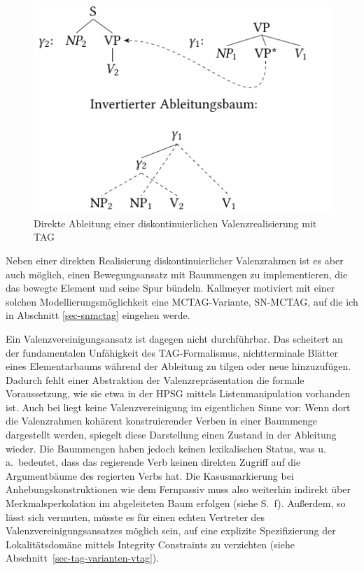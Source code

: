 \begin{figure}
\centering
\includegraphics[angle=90]{graphics/abb65.pdf}
\caption{\label{fig-kohaerenz-strategien-3}Direkte Ableitung einer diskontinuierlichen Valenzrealisierung mit TAG}
\end{figure}

Neben einer direkten Realisierung diskontinuierlicher Valenzrahmen ist es aber auch möglich, einen Bewegungsansatz mit Baummengen zu implementieren, die das bewegte Element und seine Spur bündeln. Kallmeyer motiviert mit einer solchen Modellierungsmöglichkeit eine MCTAG-Variante, SN-MCTAG, auf die ich in Abschnitt \ref{sec-snmctag} eingehen werde. 

Ein Valenzvereinigungsansatz ist dagegen nicht durchführbar. Das scheitert an der fundamentalen Unfähigkeit des TAG-Formalismus, nichtterminale Blätter eines Elementarbaums während der Ableitung zu tilgen oder neue hinzuzufügen. Dadurch fehlt einer Abstraktion der Valenzrepräsentation die formale Voraussetzung, wie sie etwa in der HPSG mittels Listenmanipulation vorhanden ist. Auch bei \citet[171]{Rambow:94} liegt keine Valenzvereinigung im eigentlichen Sinne vor: Wenn dort die Valenzrahmen kohärent konstruierender Verben in einer Baummenge dargestellt werden, spiegelt diese Darstellung  einen Zustand in der Ableitung wieder. Die Baummengen haben jedoch keinen lexikalischen Status, was u.\,a.\ bedeutet, dass das regierende Verb keinen direkten Zugriff auf die Argumentbäume des regierten Verbs hat. Die Kasusmarkierung bei Anhebungskonstruktionen wie dem Fernpassiv muss also weiterhin indirekt über Merkmals\-perkolation im abgeleiteten Baum erfolgen (siehe S.~\pageref{sec-ttmctag-fern}f). Au\ss erdem, so lässt sich vermuten, müsste es für einen echten Vertreter des Valenzvereinigungsansatzes möglich sein, auf eine explizite Spezifizierung der Lokalitätsdomäne mittels Integrity Constraints zu verzichten (siehe Abschnitt~\ref{sec-tag-varianten-vtag}).





